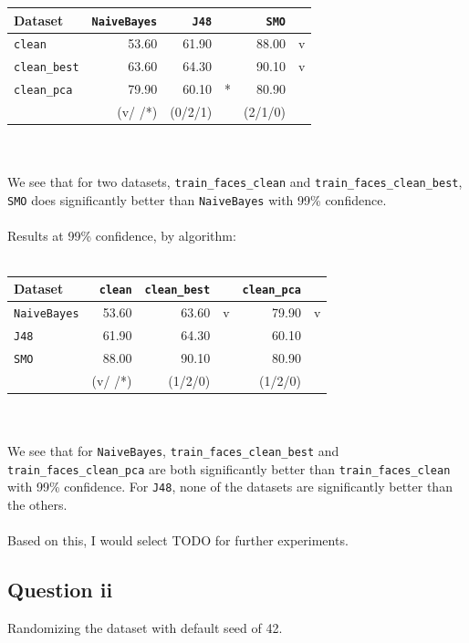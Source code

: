 \documentclass[a4paper]{article}
\begin{document}
\begin{tabular}{lr|rrrr}
Dataset           & {\tt NaiveBayes} & {\tt J48} & & {\tt SMO} & \\
\hline
{\tt clean}       &            53.60 &     61.90 & &    88.00 &v\\
{\tt clean\_best} &            63.60 &     64.30 & &    90.10 &v\\
{\tt clean\_pca}  &            79.90 &     60.10 &*&    80.90 & \\
\hline
                  &           (v/ /*)&    (0/2/1)& &   (2/1/0)&
\end{tabular}\\
\\
We see that for two datasets, {\tt train\_faces\_clean} and {\tt train\_faces\_clean\_best}, {\tt SMO} does significantly better than {\tt NaiveBayes} with 99\% confidence.\\
\\
Results at 99\% confidence, by algorithm:\\
\\
\begin{tabular}{lr|rrrr}
Dataset          & {\tt clean} & {\tt clean\_best} & & {\tt clean\_pca} & \\
\hline
{\tt NaiveBayes} &       53.60 &             63.60 &v&            79.90 &v\\
{\tt J48}        &       61.90 &             64.30 & &            60.10 & \\
{\tt SMO}        &       88.00 &             90.10 & &            80.90 & \\
\hline
                 &      (v/ /*)&            (1/2/0)& &           (1/2/0)&
\end{tabular}\\
\\
We see that for {\tt NaiveBayes}, {\tt train\_faces\_clean\_best} and {\tt train\_faces\_clean\_pca} are both significantly better than {\tt train\_faces\_clean} with 99\% confidence. For {\tt J48}, none of the datasets are significantly better than the others.\\
\\
Based on this, I would select TODO for further experiments.

\subsection*{Question ii}

Randomizing the dataset with default seed of 42.
\end{document}
